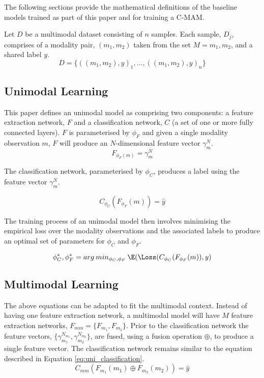 The following sections provide the mathematical definitions of the baseline models trained as part of this paper and for training a C-MAM. 

Let $D$ be a multimodal dataset consisting of $n$ samples. Each sample, $D_j$, comprises of a modality pair, $(m_1, m_2)$ taken from the set $M={m_1, m_2}$, and a shared label $y$. 
\begin{equation} \label{eq:dataset}
    D = \{((m_1, m_2), y)_1, ..., ((m_1, m_2), y)_n\}
\end{equation}

\subsection{Unimodal Learning}
This paper defines an unimodal model as comprising two components: a feature extraction network, $F$ and a classification network, $C$ (a set of one or more fully connected layers). $F$ is parameterised by $\phi_F$ and given a single modality observation $m$, $F$ will produce an $N$-dimensional feature vector $\gamma_{m}^N$.
\begin{equation} \label{eq:uni_feature}
    F_{\phi_F (m)} = \gamma_{m}^N
\end{equation}

The classification network, parameterised by $\phi_C$, produces a label using the feature vector $\gamma_{m}^N$.

\begin{equation} \label{eq:uni_classification}
    C_{\phi_C}(F_{\phi_F} (m)) = \hat{y}
\end{equation}

The training process of an unimodal model then involves minimising the empirical loss over the modality observations and the associated labels to produce an optimal set of parameters for $\phi_C$ and $\phi_F$. 

\begin{equation} \label{eq:uni_train}
    \phi_{C}^*, \phi_{F}^* = arg\:min_{\phi_C, \phi_F} \: \E (\Loss (C_{\phi_C}(F_{\phi_F} (m) ), y)
\end{equation}

\subsection{Multimodal Learning}
The above equations can be adapted to fit the multimodal context. Instead of having one feature extraction network, a multimodal model will have $M$ feature extraction networks, $F_{mm} = \{F_{m_1}, F_{m_2}\}$. Prior to the classification network the feature vectors, $\{\gamma_{m_1}^{N_{m_1}}, \gamma_{m_2}^{N_{m_2}}\}$, are fused, using a fusion operation $\oplus$, to produce a single feature vector. The classification network remains similar to the equation described in Equation \ref{eq:uni_classification}.
\begin{equation}
    C_{mm}(F_{m_1}(m_1) \oplus F_{m_2}(m_2)) = \hat{y}
\end{equation}

